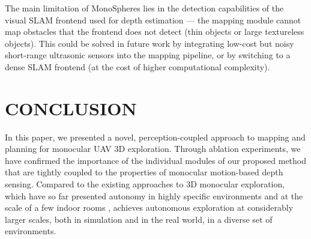 \documentclass[letterpaper, 10 pt, journal, twoside]{IEEEtran}
\newcommand{\fix}[1]{\hypersetup{allcolors=black}{\color{black} {#1}}}
\begin{document}
{{{The main limitation of MonoSpheres lies in the detection capabilities of the visual SLAM frontend used for depth estimation --- the mapping module cannot map obstacles that the frontend does not detect (thin objects or large textureless objects).
This could be solved in future work by integrating low-cost but noisy short-range ultrasonic sensors into the mapping pipeline, 
or by switching to a dense SLAM frontend (at the cost of higher computational complexity).
}

}



\section{CONCLUSION}
{In this paper, we presented a novel, perception-coupled approach to mapping and planning for monocular UAV 3D exploration.
Through ablation experiments, we have confirmed the importance of the individual modules of our proposed method that are tightly coupled to the properties of monocular motion-based depth sensing.
Compared to the existing approaches to 3D monocular exploration, which have so far presented autonomy in highly specific environments and at the scale of a few indoor rooms \cite{from_monoslam_to_explo, los_maps, simon2023mononav}, 
\fix{MonoSpheres} achieves autonomous exploration at considerably larger scales, both in simulation and in the real world, in a diverse set of environments.}









}
\end{document}
